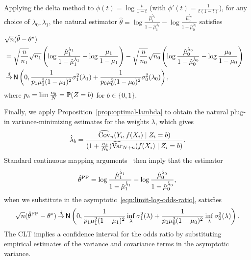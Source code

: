 Applying the delta method
to $\phi(t) = \log\frac{t}{1 - t}$ (with $\phi'(t) = \frac{1}{t(1 - t)}$),
for any choice
of $\lambda_0, \lambda_1$, the natural estimator
$\hat{\theta} =
\log \frac{\hat{\mu}_1^{\lambda_1}}{1 - \hat{\mu}_1^{\lambda_1}}
- \log \frac{\hat{\mu}_0^{\lambda_0}}{1 - \hat{\mu}_0^{\lambda_0}}$
satisfies
\begin{align}
  \nonumber
  \lefteqn{\sqrt{n} (\hat{\theta} - \theta\opt)} \\
  & = \sqrt{\frac{n}{n_1}} \sqrt{n_1}
  \left(
  \log \frac{\hat{\mu}_1^{\lambda_1}}{1 - \hat{\mu}_1^{\lambda_1}}
  - \log \frac{\mu_1}{1 - \mu_1}\right)
  - \sqrt{\frac{n}{n_0}} \sqrt{n_0}
  \left(
  \log \frac{\hat{\mu}_0^{\lambda_0}}{1 - \hat{\mu}_0^{\lambda_0}}
  - \log \frac{\mu_0}{1 - \mu_0}\right) \nonumber \\
  & \cd \normal\left(0, \frac{1}{p_1 \mu_1^2(1 - \mu_1)^2}
  \sigma^2_1(\lambda_1)
  + \frac{1}{p_0 \mu_0^2 (1 - \mu_0)^2} \sigma^2_0(\lambda_0)
  \right),
  \label{eqn:limit-log-odds-ratio}
\end{align}
where $p_b = \lim \frac{n_b}{N} = \P(Z = b)$ for $b \in \{0, 1\}$.


Finally, we apply Proposition~\ref{prop:optimal-lambda}
to obtain the natural plug-in variance-minimizing estimates for the
weights $\lambda$, which gives
\begin{equation*}
  \hat{\lambda}_b =
  \frac{\widehat\Cov_n(Y_i, f(X_i) \mid Z_i = b)}{(1 + \frac {n_b} {N_b})
    \widehat \var_{N+n}(f(X_i) \mid Z_i = b)}.
\end{equation*}
Standard continuous mapping arguments~\cite{VanDerVaart98}
then imply that the \ppipp estimator
\begin{equation*}
  \thetaPP
  = \log \frac{\hat{\mu}_1^{\hat{\lambda}_1}}{1 - \hat{\mu}_1^{\hat{\lambda}_1}}
  - \log \frac{\hat{\mu}_0^{\hat{\lambda}_0}}{1 - \hat{\mu}_0^{\hat{\lambda}_0}},
\end{equation*}
when we substitute in the asymptotic~\eqref{eqn:limit-log-odds-ratio},
satisfies
\begin{equation*}
  \sqrt{n}(\thetaPP - \theta\opt)
  \cd \normal\left(0, \frac{1}{p_1 \mu_1^2(1 - \mu_1)^2} \inf_\lambda
  \sigma_1^2(\lambda)
  + \frac{1}{p_0 \mu_0^2(1 - \mu_0)^2} \inf_\lambda
  \sigma_0^2(\lambda)\right).
\end{equation*}
The CLT implies a confidence interval for the odds ratio by substituting
empirical estimates of the variance and covariance terms in the asymptotic
variance.
